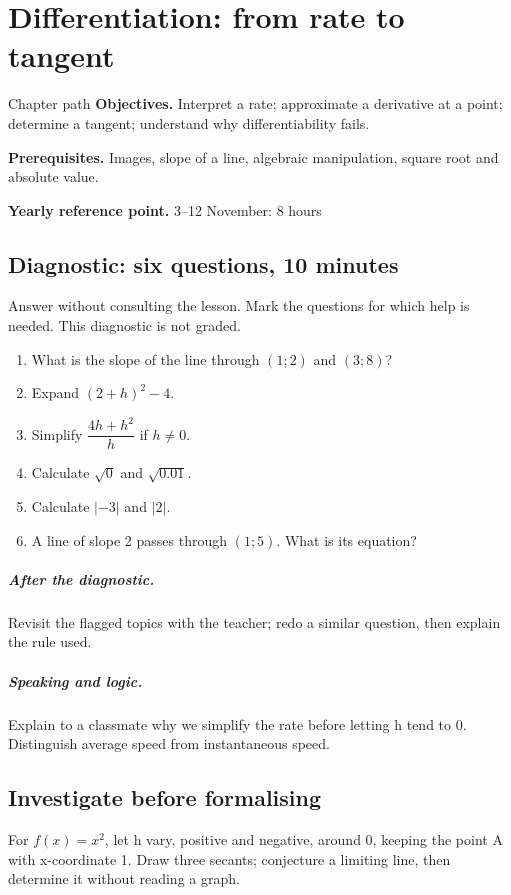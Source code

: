 \chapter{Differentiation: from rate to tangent}\label{C04}
\begin{repere}{Chapter path}
\textbf{Objectives.} Interpret a rate; approximate a derivative at a point; determine a tangent; understand why differentiability fails.

\textbf{Prerequisites.} Images, slope of a line, algebraic manipulation, square root and absolute value.

\textbf{Yearly reference point.} 3--12 November: 8 hours\end{repere}
\section*{Diagnostic: six questions, 10 minutes}\label{C04-D}
Answer without consulting the lesson. Mark the questions for which help is needed. This diagnostic is not graded.
\begin{enumerate}
\item What is the slope of the line through $(1;2)$ and $(3;8)$?
\item Expand $(2+h)^2-4$.
\item Simplify $\dfrac{4h+h^2}{h}$ if $h\ne0$.
\item Calculate $\sqrt0$ and $\sqrt{0.01}$.
\item Calculate $|-3|$ and $|2|$.
\item A line of slope 2 passes through $(1;5)$. What is its equation?
\end{enumerate}
\paragraph{After the diagnostic.} Revisit the flagged topics with the teacher; redo a similar question, then explain the rule used.
\paragraph{Speaking and logic.} Explain to a classmate why we simplify the rate before letting h tend to 0. Distinguish average speed from instantaneous speed.
\clearpage
\section*{Investigate before formalising}\label{C04-RECH}
For $f(x)=x^2$, let h vary, positive and negative, around 0, keeping the point A with x-coordinate 1. Draw three secants; conjecture a limiting line, then determine it without reading a graph.
